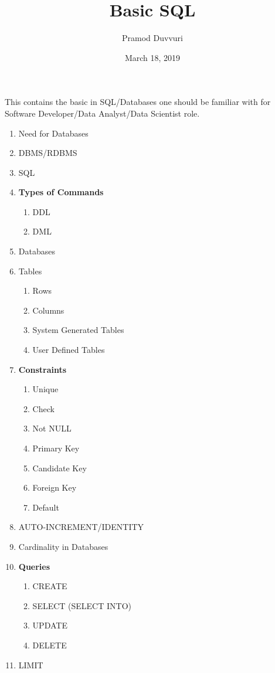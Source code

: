 \documentclass[11pt]{article}
\title{Basic SQL}
\author{Pramod Duvvuri}
\date{March 18, 2019}
\begin{document}
	\maketitle
	This contains the basic in SQL/Databases one should be familiar with for Software Developer/Data Analyst/Data Scientist role. 
	\begin{enumerate}
	\item Need for Databases
	\item DBMS/RDBMS
	\item SQL
	\item \textbf{Types of Commands}
	\begin{enumerate}
		\item DDL
		\item DML
	\end{enumerate}	
    \item Databases 
     \item Tables
     \begin{enumerate}
     	\item Rows
     	\item Columns
     	\item System Generated Tables
     	\item User Defined Tables
     \end{enumerate} 
    \item \textbf{Constraints}
    \begin{enumerate}
    	\item Unique
    	\item Check
    	\item Not NULL
    	\item Primary Key
    	\item Candidate Key
    	\item Foreign Key
    	\item Default
    \end{enumerate}
    \item AUTO-INCREMENT/IDENTITY
    \item Cardinality in Databases
    \item \textbf{Queries}
    \begin{enumerate}
    	\item CREATE
    	\item SELECT (SELECT INTO)
    	\item UPDATE
    	\item DELETE
    \end{enumerate}
   \item LIMIT

\end{enumerate}
\end{document}
